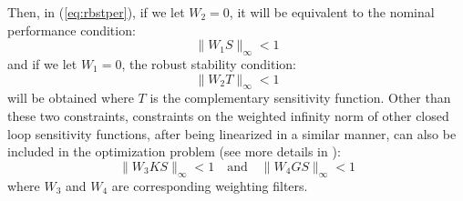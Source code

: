 \documentclass [12pt , a4paper] {article}
\begin{document}
Then, in (\ref{eq:rbstper}), if we let $W_2=0$, it will be equivalent to the nominal performance condition: 
\begin{equation}
\label{eq:nomper}
\|W_1S\|_\infty<1
\end{equation}
and if we let $W_1=0$, the robust stability condition:
\begin{equation}
\label{eq:rbststab}
\|W_2T\|_\infty<1
\end{equation}
 will be obtained where $T$ is the complementary sensitivity function. Other than these two constraints, constraints on the weighted infinity norm of other closed loop sensitivity functions, after being linearized in a similar manner, can also be included in the optimization problem (see more details in \cite{KG10}):
\begin{equation}
\label{eq:W3W4}
\|W_3KS\|_\infty<1 \quad \mbox{and} \quad \|W_4GS\|_\infty<1 
\end{equation}
where $W_3$ and $W_4$ are corresponding weighting filters.
\end{document}
